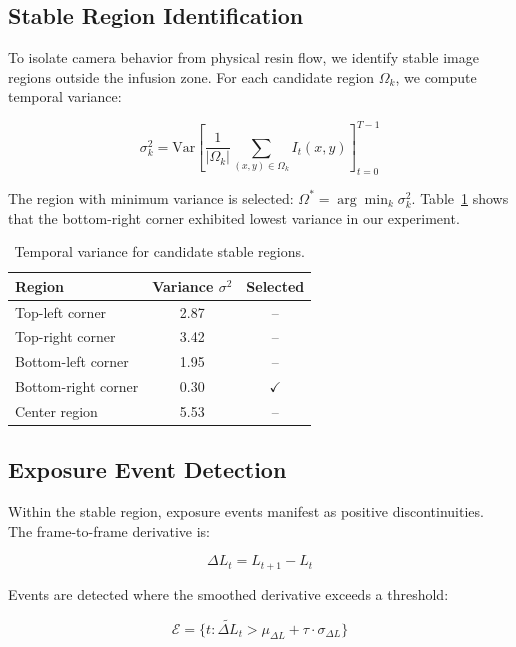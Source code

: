 \documentclass[conference]{IEEEtran}
\begin{document}
\subsection{Stable Region Identification}

To isolate camera behavior from physical resin flow, we identify stable image regions outside the infusion zone. For each candidate region $\Omega_k$, we compute temporal variance:

\begin{equation}
\sigma^2_k = \text{Var}\left[\frac{1}{|\Omega_k|}\sum_{(x,y)\in\Omega_k} I_t(x,y)\right]_{t=0}^{T-1}
\label{eq:region_variance}
\end{equation}

The region with minimum variance is selected: $\Omega^* = \arg\min_k \sigma^2_k$. Table~\ref{tab:region_variance} shows that the bottom-right corner exhibited lowest variance in our experiment.

\begin{table}[t]
\centering
\caption{Temporal variance for candidate stable regions.}
\label{tab:region_variance}
\begin{tabular}{lcc}
\toprule
\textbf{Region} & \textbf{Variance $\sigma^2$} & \textbf{Selected} \\
\midrule
Top-left corner & 2.87 & -- \\
Top-right corner & 3.42 & -- \\
Bottom-left corner & 1.95 & -- \\
Bottom-right corner & 0.30 & $\checkmark$ \\
Center region & 5.53 & -- \\
\bottomrule
\end{tabular}
\end{table}

\subsection{Exposure Event Detection}

Within the stable region, exposure events manifest as positive discontinuities. The frame-to-frame derivative is:

\begin{equation}
\Delta L_t = L_{t+1} - L_t
\label{eq:derivative}
\end{equation}

Events are detected where the smoothed derivative exceeds a threshold:

\begin{equation}
\mathcal{E} = \{t : \tilde{\Delta L}_t > \mu_{\Delta L} + \tau \cdot \sigma_{\Delta L}\}
\label{eq:event_detection}
\end{equation}
\end{document}
